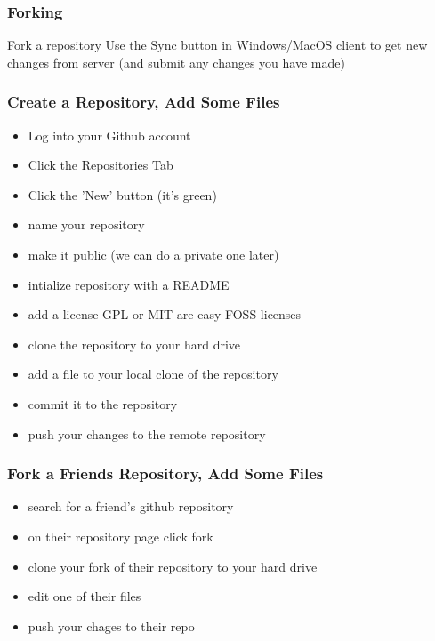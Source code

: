 \documentclass[xcolor=dvipsnames]{beamer}
\begin{document}



\begin{frame}
\frametitle{Forking}
Fork a repository
Use the Sync button in Windows/MacOS client to get new changes from server (and submit any changes you have made)
\end{frame}

\begin{frame}
\frametitle{Create a Repository, Add Some Files}
\begin{itemize}
\item Log into your Github account
\item Click the Repositories Tab
\item Click the 'New' button (it's green)
\item name your repository
\item make it public (we can do a private one later)
\item intialize repository with a README
\item add a license GPL or MIT are easy FOSS licenses
\item clone the repository to your hard drive
\item add a file to your local clone of the repository
\item commit it to the repository
\item push your changes to the remote repository
\end{itemize}
\end{frame}

\begin{frame}
\frametitle{Fork a Friends Repository, Add Some Files}
\begin{itemize}
\item search for a friend's github repository
\item on their repository page click fork
\item clone your fork of their repository to your hard drive
\item edit one of their files
\item push your chages to their repo
\end{itemize}
\end{frame}
\end{document}
